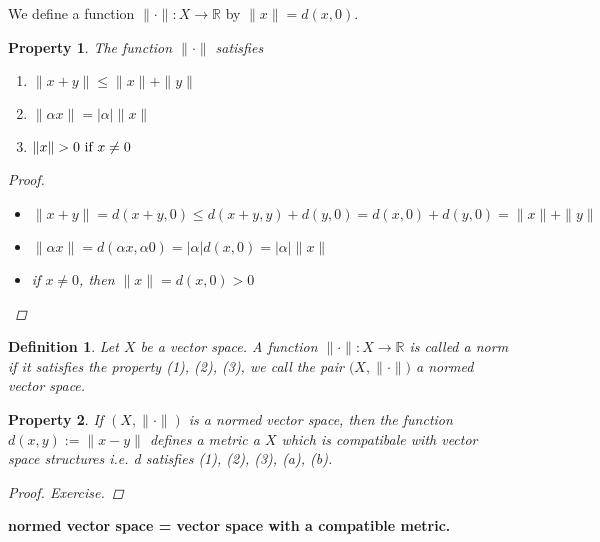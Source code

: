 \documentclass{article}
\newtheorem*{property}{Property}
\newtheorem*{definition}{Definition}
\begin{document}
We define a function $\|\cdot\|:X \rightarrow \mathbb{R}$ by $\|x\|=d(x, 0)$.
\begin{property}
    The function $\|\cdot\|$ satisfies
    \begin{enumerate}
        \item $\|x + y\| \le \|x\| + \|y\|$
        \item $\|\alpha x\| = |\alpha|\|x\|$
        \item $\|x\| > 0 \textnormal{ if } x \ne 0$
    \end{enumerate}
    \begin{proof} \hfill
        \begin{itemize}
            \item $\|x + y\|=d(x+y, 0) \le d(x+y, y) + d(y, 0) = d(x, 0) + d(y, 0) = \|x\| + \|y\|$
            \item $\|\alpha x\| = d(\alpha x, \alpha 0) = |\alpha|d(x, 0) = |\alpha|\|x\|$
            \item if $x \ne 0$, then $\|x\|=d(x, 0) > 0$
        \end{itemize}
    \end{proof}
\end{property}
\begin{definition}
    Let $X$ be a vector space. A function $\|\cdot\|: X \rightarrow \mathbb{R}$ is called a norm
    if it satisfies the property (1), (2), (3), we call the pair $\bigl(X, \|\cdot\|\bigr)$ a normed vector space.
\end{definition}
\begin{property}
If $(X, \|\cdot\|)$ is a normed vector space, then the function $d(x, y):=\|x-y\|$
defines a metric a $X$ which is compatibale with vector space structures
i.e. d satisfies (1), (2), (3), (a), (b).
\begin{proof}
    Exercise.
\end{proof}
\end{property}
\textbf{normed vector space = vector space with a compatible metric.}
\end{document}
